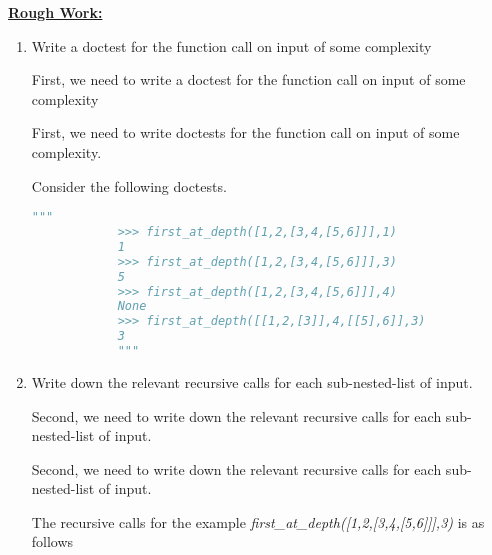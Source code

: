 \documentclass[12pt]{article}
\begin{document}
\begin{enumerate}[a.]
    \begin{mdframed}
        \underline{\textbf{Rough Work:}}

        \bigskip

        \begin{enumerate}[1.]
            \item Write a doctest for the function call on input of some complexity

            \bigskip

            First, we need to write a doctest for the function call on input of some complexity

            \bigskip

            \begin{mdframed}

            \bigskip

            First, we need to write doctests for the function call on input of some complexity.

            \bigskip

            Consider the following doctests.

            \begin{lstlisting}[language=python]
            """
            >>> first_at_depth([1,2,[3,4,[5,6]]],1)
            1
            >>> first_at_depth([1,2,[3,4,[5,6]]],3)
            5
            >>> first_at_depth([1,2,[3,4,[5,6]]],4)
            None
            >>> first_at_depth([[1,2,[3]],4,[[5],6]],3)
            3
            """
            \end{lstlisting}

            \end{mdframed}

            \item Write down the relevant recursive calls for each sub-nested-list of input.

            \bigskip

            Second, we need to write down the relevant recursive calls for each sub-nested-list of input.

            \bigskip

            \begin{mdframed}

            \bigskip

            Second, we need to write down the relevant recursive calls for each sub-nested-list of input.

            \bigskip

            The recursive calls for the example \textit{first\_at\_depth([1,2,[3,4,[5,6]]],3)}
            is as follows


\end{mdframed}
\end{enumerate}
\end{mdframed}
\end{enumerate}
\end{document}
